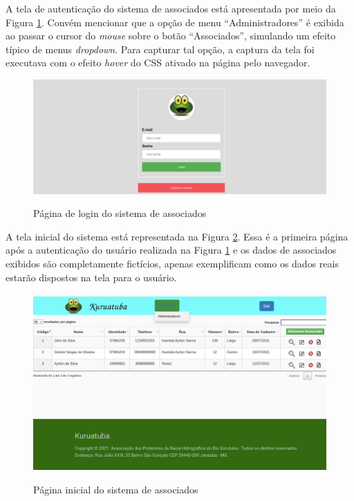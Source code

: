 \newpage
\clearpage

A tela de autenticação do sistema de associados está apresentada por meio da Figura \ref{fig:login-sistema}. Convém mencionar que a opção de menu ``Administradores'' é exibida ao passar o cursor do \textit{mouse} sobre o botão ``Associados'', simulando um efeito típico de menus \textit{dropdown}. Para capturar tal opção, a captura da tela foi executava com o efeito \textit{hover} do CSS ativado na página pelo navegador. 


\begin{figure}[htb]
 \centering
 \caption{Página de login do sistema de associados}
 \includegraphics[width=1\textwidth]{figuras/kuruatuba_sistema_login.png}
 \label{fig:login-sistema}
\end{figure}


A tela inicial do sistema está representada na Figura \ref{fig:home-sistema}. Essa é a primeira página após a autenticação do usuário realizada na Figura \ref{fig:login-sistema} e os dados de associados exibidos são completamente fictícios, apenas exemplificam como  os dados reais estarão dispostos na tela para o usuário.

\newpage

\begin{figure}[htb]
 \centering
 \caption{Página inicial do sistema de associados}
 \includegraphics[width=1\textwidth]{figuras/kuruatuba_sistema_home.png}
 \label{fig:home-sistema}
\end{figure}


